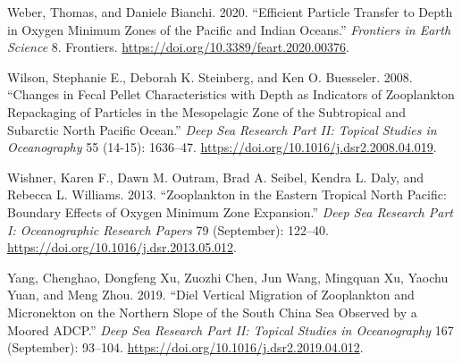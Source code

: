 \documentclass[]{article}
\begin{document}
\leavevmode\hypertarget{ref-weberEfficientParticleTransfer2020}{}%
Weber, Thomas, and Daniele Bianchi. 2020. ``Efficient Particle Transfer
to Depth in Oxygen Minimum Zones of the Pacific and Indian Oceans.''
\emph{Frontiers in Earth Science} 8. Frontiers.
\url{https://doi.org/10.3389/feart.2020.00376}.

\leavevmode\hypertarget{ref-wilsonChangesFecalPellet2008}{}%
Wilson, Stephanie E., Deborah K. Steinberg, and Ken O. Buesseler. 2008.
``Changes in Fecal Pellet Characteristics with Depth as Indicators of
Zooplankton Repackaging of Particles in the Mesopelagic Zone of the
Subtropical and Subarctic North Pacific Ocean.'' \emph{Deep Sea Research
Part II: Topical Studies in Oceanography} 55 (14-15): 1636--47.
\url{https://doi.org/10.1016/j.dsr2.2008.04.019}.

\leavevmode\hypertarget{ref-wishnerZooplanktonEasternTropical2013}{}%
Wishner, Karen F., Dawn M. Outram, Brad A. Seibel, Kendra L. Daly, and
Rebecca L. Williams. 2013. ``Zooplankton in the Eastern Tropical North
Pacific: Boundary Effects of Oxygen Minimum Zone Expansion.'' \emph{Deep
Sea Research Part I: Oceanographic Research Papers} 79 (September):
122--40. \url{https://doi.org/10.1016/j.dsr.2013.05.012}.

\leavevmode\hypertarget{ref-yangDielVerticalMigration2019}{}%
Yang, Chenghao, Dongfeng Xu, Zuozhi Chen, Jun Wang, Mingquan Xu, Yaochu
Yuan, and Meng Zhou. 2019. ``Diel Vertical Migration of Zooplankton and
Micronekton on the Northern Slope of the South China Sea Observed by a
Moored ADCP.'' \emph{Deep Sea Research Part II: Topical Studies in
Oceanography} 167 (September): 93--104.
\url{https://doi.org/10.1016/j.dsr2.2019.04.012}.
\end{document}
